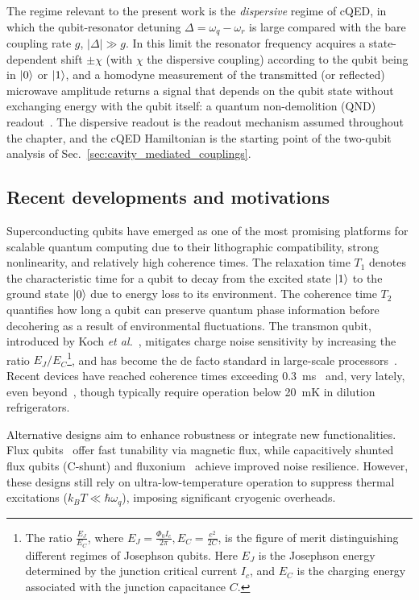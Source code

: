 The regime relevant to the present work is the \emph{dispersive} regime of cQED, in which the qubit-resonator detuning $\Delta = \omega_q - \omega_r$ is large compared with the bare coupling rate $g$, $|\Delta| \gg g$. In this limit the resonator frequency acquires a state-dependent shift $\pm\chi$ (with $\chi$ the dispersive coupling) according to the qubit being in $\ket{0}$ or $\ket{1}$, and a homodyne measurement of the transmitted (or reflected) microwave amplitude returns a signal that depends on the qubit state without exchanging energy with the qubit itself: a quantum non-demolition (QND) readout~\cite{Schuster2005PRL,blais2021circuit}. The dispersive readout is the readout mechanism assumed throughout the chapter, and the cQED Hamiltonian is the starting point of the two-qubit analysis of Sec.~\ref{sec:cavity_mediated_couplings}.

\subsection{Recent developments and motivations}
\label{sec:state_of_the_art_survey}

Superconducting qubits have emerged as one of the most promising platforms for scalable quantum computing due to their lithographic compatibility, strong nonlinearity, and relatively high coherence times. The relaxation time $T_{1}$ denotes the characteristic time for a qubit to decay from the excited state $\ket{1}$ to the ground state $\ket{0}$ due to energy loss to its environment. 
The coherence time $T_{2}$ quantifies how long a qubit can preserve quantum phase 
information before decohering as a result of environmental fluctuations.
The transmon qubit, introduced by Koch \emph{et al.}~\cite{Koch2007Transmon}, mitigates charge noise sensitivity by increasing the ratio $E_J/E_C$\footnote{The ratio $\tfrac{E_J}{E_C}$, where 
$E_J = \frac{\Phi_0 I_c}{2\pi}, E_C = \frac{e^2}{2C}$,
is the figure of merit distinguishing different regimes of Josephson qubits. 
Here $E_J$ is the Josephson energy determined by the junction critical current $I_c$, 
and $E_C$ is the charging energy associated with the junction capacitance $C$.}, and has become the de facto standard in large-scale processors~\cite{kjaergaard2020}. Recent devices have reached coherence times exceeding 0.3~ms~\cite{place2021} and, very lately, even beyond~\cite{tuokkola_methods_2025}, though typically require operation below 20~mK in dilution refrigerators.

Alternative designs aim to enhance robustness or integrate new functionalities. Flux qubits~\cite{yan2016flux} offer fast tunability via magnetic flux, while capacitively shunted flux qubits (C-shunt) and fluxonium~\cite{manucharyan2009fluxonium} achieve improved noise resilience. However, these designs still rely on ultra-low-temperature operation to suppress thermal excitations ($k_BT \ll \hbar \omega_q$), imposing significant cryogenic overheads.

